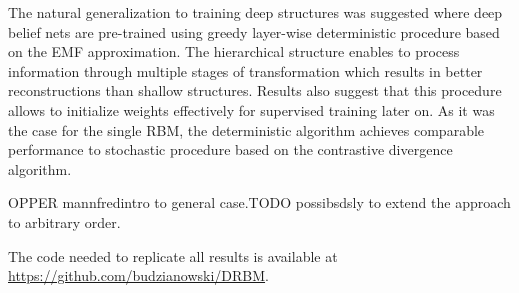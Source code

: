 The natural generalization to training deep structures was suggested where deep belief nets are pre-trained using greedy layer-wise deterministic procedure based on the EMF approximation. The hierarchical structure enables to process information through multiple stages of transformation which results in better reconstructions than shallow structures. Results also suggest that this procedure allows to initialize weights effectively for supervised training later on. As it was the case for the single RBM, the deterministic algorithm achieves comparable performance to stochastic procedure based on the contrastive divergence algorithm.

OPPER  mannfredintro to general case.TODO possibsdsly to extend the approach to arbitrary order.

The code needed to replicate all results is available at \url{https://github.com/budzianowski/DRBM}. 

